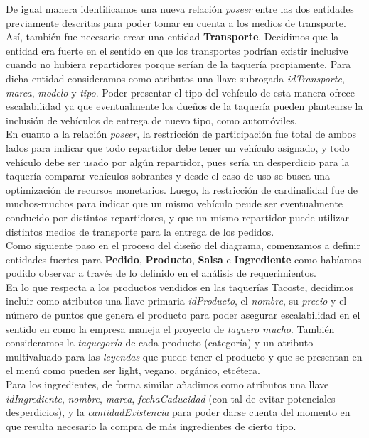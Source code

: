 \documentclass[11pt,letterpaper]{article}
\begin{document}
\newpage 
De igual manera identificamos una nueva relación \textit{poseer} entre las dos entidades previamente descritas para poder tomar en cuenta a los medios de transporte. Así, también fue necesario crear una entidad \textbf{Transporte}. Decidimos que la entidad era fuerte en el sentido en que los transportes podrían existir inclusive cuando no hubiera repartidores porque serían de la taquería propiamente. Para dicha entidad consideramos como atributos una llave subrogada \textit{idTransporte}, \textit{marca}, \textit{modelo} y \textit{tipo}. Poder presentar el tipo del vehículo de esta manera ofrece escalabilidad ya que eventualmente los dueños de la taquería pueden plantearse la inclusión de vehículos de entrega de nuevo tipo, como automóviles. \\

En cuanto a la relación \textit{poseer}, la restricción de participación fue total de ambos lados para indicar que todo repartidor debe tener un vehículo asignado, y todo vehículo debe ser usado por algún repartidor, pues sería un desperdicio para la taquería comparar vehículos sobrantes y desde el caso de uso se busca una optimización de recursos monetarios. Luego, la restricción de cardinalidad fue de muchos-muchos para indicar que un mismo vehículo peude ser eventualmente conducido por distintos repartidores, y que un mismo repartidor puede utilizar distintos medios de transporte para la entrega de los pedidos. \\

Como siguiente paso en el proceso del diseño del diagrama, comenzamos a definir entidades fuertes para \textbf{Pedido}, \textbf{Producto}, \textbf{Salsa} e  \textbf{Ingrediente} como habíamos podido observar a través de lo definido en el análisis de requerimientos. \\

En lo que respecta a los productos vendidos en las taquerías Tacoste, decidimos incluir como atributos una llave primaria \textit{idProducto}, el \textit{nombre}, su \textit{precio} y el número de puntos que genera el producto para poder asegurar escalabilidad en el sentido en como la empresa maneja el proyecto de \textit{taquero mucho}. También consideramos la \textit{taquegoría} de cada producto (categoría) y un atributo multivaluado para las \textit{leyendas} que puede tener el producto y que se presentan en el menú como pueden ser light, vegano, orgánico, etcétera.\\

Para los ingredientes, de forma similar añadimos como atributos una llave \textit{idIngrediente}, \textit{nombre}, \textit{marca}, \textit{fechaCaducidad} (con tal de evitar potenciales desperdicios), y la \textit{cantidadExistencia} para poder darse cuenta del momento en que resulta necesario la compra de más ingredientes de cierto tipo. \\
\end{document}
